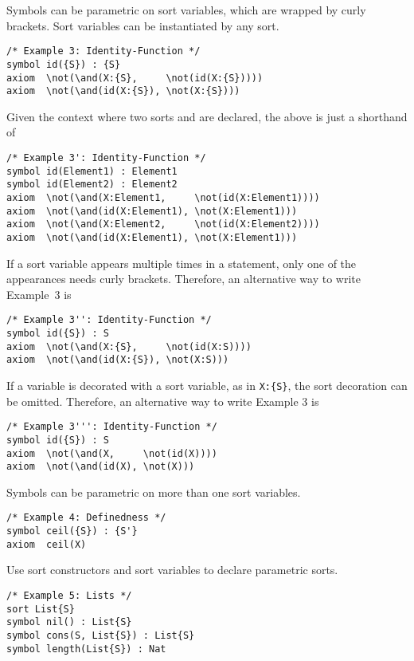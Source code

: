 \documentclass[UTF8,11pt]{article}
\theoremstyle{plain}
\theoremstyle{definition}
\theoremstyle{remark}
\begin{document}
Symbols can be parametric on sort variables, which are wrapped by curly 
brackets. 
Sort variables can be instantiated by any sort.

\begin{Verbatim}[fontsize=\small]
/* Example 3: Identity-Function */
symbol id({S}) : {S}
axiom  \not(\and(X:{S},     \not(id(X:{S}))))
axiom  \not(\and(id(X:{S}), \not(X:{S})))
\end{Verbatim}

Given the context where two sorts  and  are 
declared, the above is just a shorthand of

\begin{Verbatim}[fontsize=\small]
/* Example 3': Identity-Function */
symbol id(Element1) : Element1
symbol id(Element2) : Element2
axiom  \not(\and(X:Element1,     \not(id(X:Element1))))
axiom  \not(\and(id(X:Element1), \not(X:Element1)))
axiom  \not(\and(X:Element2,     \not(id(X:Element2))))
axiom  \not(\and(id(X:Element1), \not(X:Element1)))
\end{Verbatim}

If a sort variable appears multiple times in a statement, only one of the 
appearances needs curly brackets.
Therefore, an alternative way to write Example~3 is
\begin{Verbatim}[fontsize=\small]
/* Example 3'': Identity-Function */
symbol id({S}) : S
axiom  \not(\and(X:{S},     \not(id(X:S))))
axiom  \not(\and(id(X:{S}), \not(X:S)))
\end{Verbatim}

If a variable is decorated with a sort variable, as in {\small\verb|X:{S}|}, 
the sort decoration can be omitted. Therefore, an alternative way to write 
Example 3 is
\begin{Verbatim}[fontsize=\small]
/* Example 3''': Identity-Function */
symbol id({S}) : S
axiom  \not(\and(X,     \not(id(X))))
axiom  \not(\and(id(X), \not(X)))
\end{Verbatim}

Symbols can be parametric on more than one sort variables.
\begin{Verbatim}[fontsize=\small]
/* Example 4: Definedness */
symbol ceil({S}) : {S'}
axiom  ceil(X)
\end{Verbatim}

Use sort constructors and sort variables to declare parametric sorts.
\begin{Verbatim}[fontsize=\small]
/* Example 5: Lists */
sort List{S}
symbol nil() : List{S}
symbol cons(S, List{S}) : List{S}
symbol length(List{S}) : Nat
\end{Verbatim}
\end{document}
